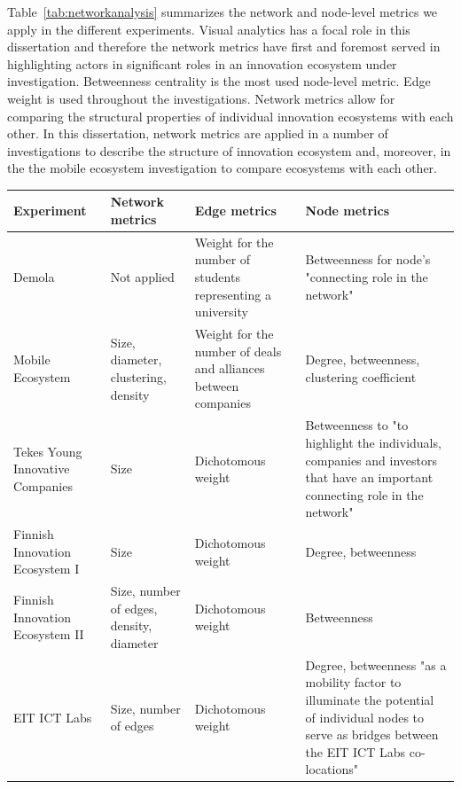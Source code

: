 Table~\ref{tab:networkanalysis} summarizes the network and node-level metrics we apply in the different experiments. Visual analytics has a focal role in this dissertation and therefore the network metrics have first and foremost served in highlighting actors in significant roles in an innovation ecosystem under investigation. Betweenness centrality is the most used node-level metric. Edge weight is used throughout the investigations. Network metrics allow for comparing the structural properties of individual innovation ecosystems with each other. In this dissertation, network metrics are applied in a number of investigations to describe the structure of innovation ecosystem and, moreover, in the the mobile ecosystem investigation to compare ecosystems with each other.

\begingroup
{}\label{tab:networkanalysis}
\begin{tabular}{p{2.5cm} p{2.5cm} p{3cm} p{3.75cm}}
\toprule
Experiment & Network metrics & Edge metrics & Node metrics \\
\midrule
Demola &
Not applied &
Weight for the number of students representing a university & 
Betweenness for node's "connecting role in the network" \\

Mobile Ecosystem & 
Size, diameter, clustering, density &
Weight for the number of deals and alliances between companies &
Degree, betweenness, clustering coefficient \\

Tekes Young Innovative Companies &
Size &
Dichotomous weight &
Betweenness to "to highlight the individuals, companies and investors that have an important connecting role in the network" \\

Finnish Innovation Ecosystem I & 
Size & 
Dichotomous weight &
Degree, betweenness \\

Finnish Innovation Ecosystem II  &
Size, number of edges, density, diameter &
Dichotomous weight &
Betweenness \\

EIT ICT Labs &
Size, number of edges &
Dichotomous weight &
Degree, betweenness "as a mobility factor to illuminate the potential of individual nodes to serve as bridges between the EIT ICT Labs co-locations" \\
\bottomrule
\end{tabular}
\endgroup

